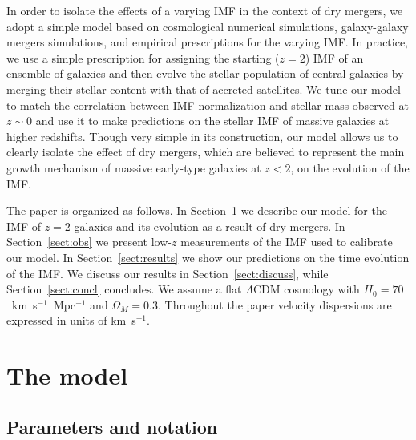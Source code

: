 \documentclass[usenatbib]{mnras}
\def\Sref#1{Section~\ref{#1}\xspace}
\begin{document}
In order to isolate the effects of a varying  IMF in the context of dry mergers, we adopt a simple model based on cosmological numerical simulations, galaxy-galaxy mergers simulations, and empirical prescriptions for the varying IMF. In practice, we use a simple
prescription for assigning the starting ($z=2$)
  IMF of an ensemble of galaxies and then evolve the stellar
population of central galaxies by merging their stellar content with
that of accreted satellites. We tune our model to match the
  correlation between IMF normalization and stellar mass observed at
  $z\sim0$ and use it to make predictions on the stellar IMF of
  massive galaxies at higher redshifts. Though very simple in its
construction, our model allows us to clearly isolate the effect of dry
mergers, which are believed to represent the main growth mechanism of
massive early-type galaxies at $z < 2$, on the evolution of the IMF.


The paper is organized as follows.  In \Sref{sect:model} we describe
our model for the IMF of $z=2$ galaxies and its evolution as a result
of dry mergers.  In \Sref{sect:obs} we present low-$z$ measurements of
the IMF used to calibrate our model.  In \Sref{sect:results} we show
our predictions on the time evolution of the IMF.  We discuss our
results in \Sref{sect:discuss}, while \Sref{sect:concl}
concludes. We assume a flat $\Lambda$CDM cosmology with $H_0=70$~km~s$^{-1}$~Mpc$^{-1}$ and $\Omega_M = 0.3$. Throughout the paper velocity dispersions are expressed in units of km~s$^{-1}$.


\section{The model}\label{sect:model}

\subsection{Parameters and notation}
\end{document}
